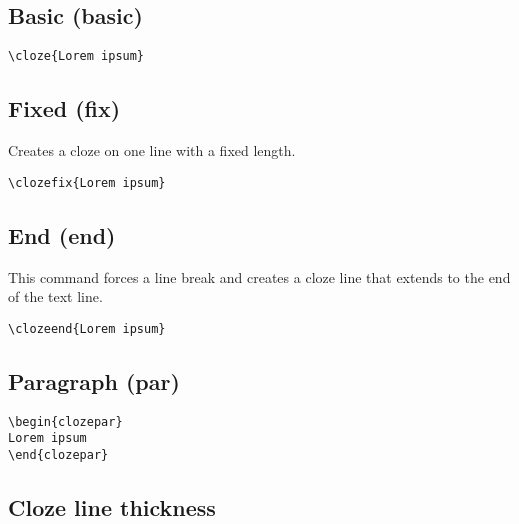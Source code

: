 \documentclass{article}
\begin{document}

\subsection{Basic (basic)}

\begin{lstlisting}
\cloze{Lorem ipsum}
\end{lstlisting}


\subsection{Fixed (fix)}

Creates a cloze on one line with a fixed length.

\begin{lstlisting}
\clozefix{Lorem ipsum}
\end{lstlisting}


\subsection{End (end)}

This command forces a line break and creates a cloze line that extends
to the end of the text line.

\begin{lstlisting}
\clozeend{Lorem ipsum}
\end{lstlisting}


\subsection{Paragraph (par)}

\begin{lstlisting}
\begin{clozepar}
Lorem ipsum
\end{clozepar}
\end{lstlisting}


\subsection{Cloze line thickness}
\end{document}
